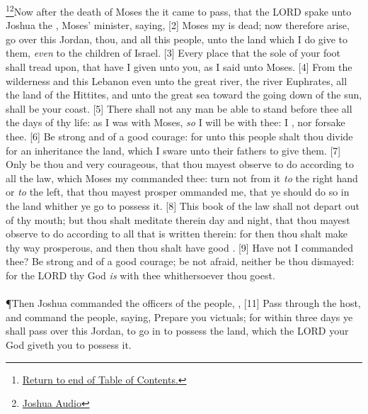 \footnote{\textcolor[cmyk]{0.99998,1,0,0}{\hyperlink{TOC}{Return to end of Table of Contents.}}}\footnote{\href{https://audiobible.com/bible/joshua_1.html}{\textcolor[cmyk]{0.99998,1,0,0}{Joshua Audio}}}\textcolor[cmyk]{0.99998,1,0,0}{Now after the death of Moses the  it came to pass, that the LORD spake unto Joshua the , Moses' minister, saying,}
[2] \textcolor[cmyk]{0.99998,1,0,0}{Moses my  is dead; now therefore arise, go over this Jordan, thou, and all this people, unto the land which I do give to them, \emph{even} to the children of Israel.}
[3] \textcolor[cmyk]{0.99998,1,0,0}{Every place that the sole of your foot shall tread upon, that have I given unto you, as I said unto Moses.}
[4] \textcolor[cmyk]{0.99998,1,0,0}{From the wilderness and this Lebanon even unto the great river, the river Euphrates, all the land of the Hittites, and unto the great sea toward the going down of the sun, shall be your coast.}
[5] \textcolor[cmyk]{0.99998,1,0,0}{There shall not any man be able to stand before thee all the days of thy life: as I was with Moses, \emph{so} I will be with thee: I , nor forsake thee.}
[6] \textcolor[cmyk]{0.99998,1,0,0}{Be strong and of a good courage: for unto this people shalt thou divide for an inheritance the land, which I sware unto their fathers to give them.}
[7] \textcolor[cmyk]{0.99998,1,0,0}{Only be thou  and very courageous, that thou mayest observe to do according to all the law, which Moses my  commanded thee: turn not from it \emph{to} the right hand or \emph{to} the left, that thou mayest prosper ommanded me, that ye should do so in the land whither ye go to possess it.}
[8] \textcolor[cmyk]{0.99998,1,0,0}{This book of the law shall not depart out of thy mouth; but thou shalt meditate therein day and night, that thou mayest observe to do according to all that is written therein: for then thou shalt make thy way prosperous, and then thou shalt have good .}
[9] \textcolor[cmyk]{0.99998,1,0,0}{Have not I commanded thee? Be strong and of a good courage; be not afraid, neither be thou dismayed: for the LORD thy God \emph{is} with thee whithersoever thou goest.}\\
\\
\P \textcolor[cmyk]{0.99998,1,0,0}{Then Joshua commanded the officers of the people, ,}
[11] \textcolor[cmyk]{0.99998,1,0,0}{Pass through the host, and command the people, saying, Prepare you victuals; for within three days ye shall pass over this Jordan, to go in to possess the land, which the LORD your God giveth you to possess it.}\\
